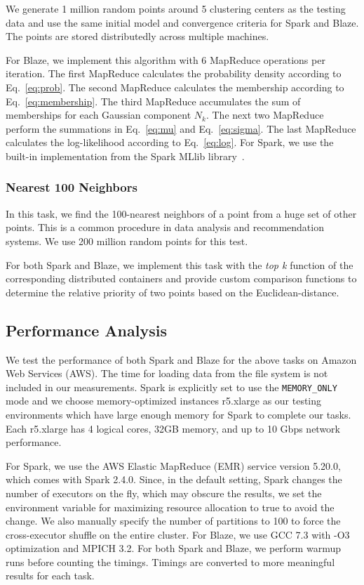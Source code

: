 We generate 1 million random points around 5 clustering centers as the testing data and use the same initial model and convergence criteria for Spark and Blaze.
The points are stored distributedly across multiple machines.

For Blaze, we implement this algorithm with 6 MapReduce operations per iteration.
The first MapReduce calculates the probability density according to Eq.~\ref{eq:prob}.
The second MapReduce calculates the membership according to Eq.~\ref{eq:membership}.
The third MapReduce accumulates the sum of memberships for each Gaussian component $N_k$.
The next two MapReduce perform the summations in Eq.~\ref{eq:mu} and Eq.~\ref{eq:sigma}.
The last MapReduce calculates the log-likelihood according to Eq.~\ref{eq:log}.
For Spark, we use the built-in implementation from the Spark MLlib library~\cite{meng2016mllib}.

\subsubsection{Nearest 100 Neighbors}

In this task, we find the 100-nearest neighbors of a point from a huge set of other points.
This is a common procedure in data analysis and recommendation systems.
We use 200 million random points for this test.

For both Spark and Blaze, we implement this task with the \emph{top k} function of the corresponding distributed containers and provide custom comparison functions to determine the relative priority of two points based on the Euclidean-distance.

\subsection{Performance Analysis}

We test the performance of both Spark and Blaze for the above tasks on Amazon Web Services (AWS).
The time for loading data from the file system is not included in our measurements.
Spark is explicitly set to use the \lstinline{MEMORY_ONLY} mode and we choose memory-optimized instances r5.xlarge as our testing environments which have large enough memory for Spark to complete our tasks.
Each r5.xlarge has 4 logical cores, 32GB memory, and up to 10 Gbps network performance.

For Spark, we use the AWS Elastic MapReduce (EMR) service version 5.20.0, which comes with Spark 2.4.0.
Since, in the default setting, Spark changes the number of executors on the fly, which may obscure the results, we set the environment variable for maximizing resource allocation to true to avoid the change.
We also manually specify the number of partitions to 100 to force the cross-executor shuffle on the entire cluster.
For Blaze, we use GCC 7.3 with -O3 optimization and MPICH 3.2. 
For both Spark and Blaze, we perform warmup runs before counting the timings.
Timings are converted to more meaningful results for each task.

